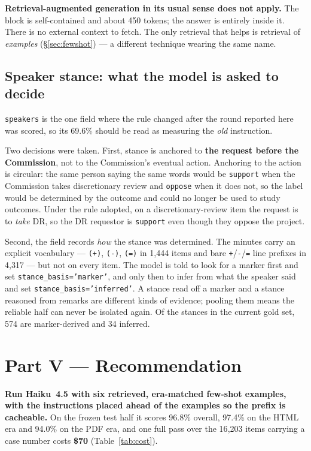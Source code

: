 \documentclass[11pt]{article}
\begin{document}
\textbf{Retrieval-augmented generation in its usual sense does not apply.} The block is
self-contained and about 450 tokens; the answer is entirely inside it. There is no external
context to fetch. The only retrieval that helps is retrieval of \emph{examples}
(\S\ref{sec:fewshot}) --- a different technique wearing the same name.

\subsection{Speaker stance: what the model is asked to decide}
\label{sec:stance}

\texttt{speakers} is the one field where the rule changed after the round reported here was
scored, so its 69.6\% should be read as measuring the \emph{old} instruction.

Two decisions were taken. First, stance is anchored to \textbf{the request before the
Commission}, not to the Commission's eventual action. Anchoring to the action is circular: the
same person saying the same words would be \texttt{support} when the Commission takes
discretionary review and \texttt{oppose} when it does not, so the label would be determined by
the outcome and could no longer be used to study outcomes. Under the rule adopted, on a
discretionary-review item the request is to \emph{take} DR, so the DR requestor is
\texttt{support} even though they oppose the project.

Second, the field records \emph{how} the stance was determined. The minutes carry an explicit
vocabulary --- \texttt{(+)}, \texttt{(-)}, \texttt{(=)} in 1{,}444 items and bare
\texttt{+}/\texttt{-}/\texttt{=} line prefixes in 4{,}317 --- but not on every item. The model
is told to look for a marker first and set \texttt{stance\_basis='marker'}, and only then to
infer from what the speaker said and set \texttt{stance\_basis='inferred'}. A stance read off
a marker and a stance reasoned from remarks are different kinds of evidence; pooling them
means the reliable half can never be isolated again. Of the stances in the current gold set,
574 are marker-derived and 34 inferred.

\section{Part V --- Recommendation}

\textbf{Run Haiku~4.5 with six retrieved, era-matched few-shot examples, with the
instructions placed ahead of the examples so the prefix is cacheable.} On the frozen test
half it scores 96.8\% overall, 97.4\% on the HTML era and 94.0\% on the PDF era, and one full
pass over the 16{,}203 items carrying a case number costs \textbf{\$70}
(Table~\ref{tab:cost}).
\end{document}
